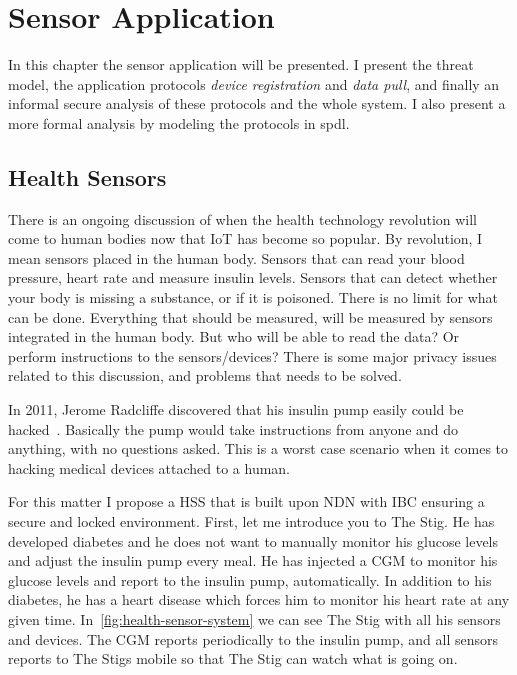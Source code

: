 \chapter{Sensor Application}\label{sensor-application}
In this chapter the sensor application will be presented. 
I present the threat model, the application protocols \textit{device registration} and \textit{data pull}, and finally an informal secure analysis of these protocols and the whole system. 
I also present a more formal analysis by modeling the protocols in \gls{spdl}.

\section{Health Sensors}
There is an ongoing discussion of when the health technology revolution will come to human bodies now that \gls{IoT} has become so popular.
By revolution, I mean sensors placed in the human body. 
Sensors that can read your blood pressure, heart rate and measure insulin levels.
Sensors that can detect whether your body is missing a substance, or if it is poisoned. 
There is no limit for what can be done.
Everything that should be measured, will be measured by sensors integrated in the human body.
But who will be able to read the data?
Or perform instructions to the sensors/devices?
There is some major privacy issues related to this discussion, and problems that needs to be solved.

In 2011, Jerome Radcliffe discovered that his insulin pump easily could be hacked~\cite{radcliffe2011hacking}.
Basically the pump would take instructions from anyone and do anything, with no questions asked. 
This is a worst case scenario when it comes to hacking medical devices attached to a human.

For this matter I propose a \gls{HSS} that is built upon \gls{NDN} with \gls{IBC} ensuring a secure and locked environment.
First, let me introduce you to The Stig. 
He has developed diabetes and he does not want to manually monitor his glucose levels and adjust the insulin pump every meal. 
He has injected a \gls{CGM} to monitor his glucose levels and report to the insulin pump, automatically.
In addition to his diabetes, he has a heart disease which forces him to monitor his heart rate at any given time. 
In~\autoref{fig:health-sensor-system} we can see The Stig with all his sensors and devices. 
The \gls{CGM} reports periodically to the insulin pump, and all sensors reports to The Stigs mobile so that The Stig can watch what is going on.

